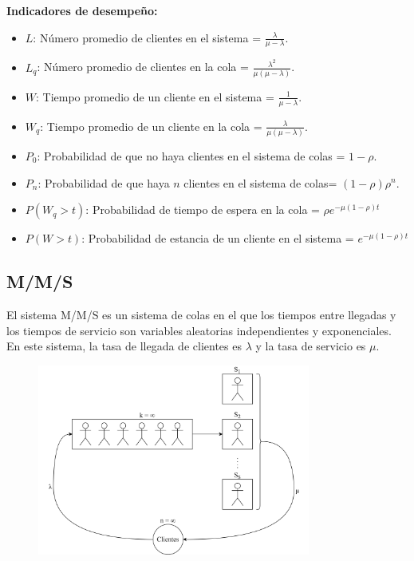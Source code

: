 \documentclass{templateNote}
\begin{document}
\textbf{Indicadores de desempeño:}
\begin{itemize}
    \item $L$: Número promedio de clientes en el sistema = $\frac{\lambda}{\mu - \lambda}$.
    \item $L_q$: Número promedio de clientes en la cola = $\frac{\lambda^2}{\mu(\mu - \lambda)}$.
    \item $W$: Tiempo promedio de un cliente en el sistema = $\frac{1}{\mu - \lambda}$.
    \item $W_q$: Tiempo promedio de un cliente en la cola = $\frac{\lambda}{\mu(\mu - \lambda)}$.
    \item $P_0$: Probabilidad de que no haya clientes en el sistema de colas = $1 - \rho$.
    \item $P_n$: Probabilidad de que haya $n$ clientes en el sistema de colas= $(1 - \rho)\rho^n$.
    \item $P(W_q>t)$: Probabilidad de tiempo de espera en la cola = $\rho e^{-\mu(1-\rho)t}$
    \item $P(W>t)$: Probabilidad de estancia de un cliente en el sistema = $e^{-\mu(1-\rho)t}$
\end{itemize}


\subsection{M/M/S}
\noindent El sistema M/M/S es un sistema de colas en el que los tiempos entre llegadas y los tiempos de servicio son variables aleatorias independientes y exponenciales. En este sistema, la tasa de llegada de clientes es $\lambda$ y la tasa de servicio es $\mu$.

\begin{figure}[H]
    \centering
    \includegraphics[width=0.8\textwidth]{img/mms.png}
\end{figure}
\end{document}
